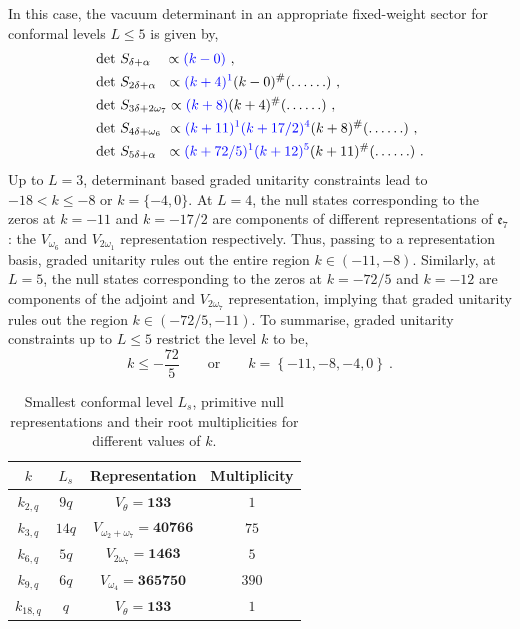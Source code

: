 In this case, the vacuum determinant in an appropriate fixed-weight sector for conformal levels $L \leqslant 5$ is given by, 
\begin{equation} \label{eq:lowlevele7det1to5}
\begin{split}
    &\text{det}~S_{\delta + \alpha} \ \ \ \propto \textcolor{blue}{(k - 0)}~, \\
    &\text{det}~S_{2\delta + \alpha} \ \ \propto \textcolor{blue}{(k + 4)^1}(k - 0)^{\#} (\ldots \ldots)~, \\ 
    &\text{det}~S_{3\delta + 2\omega_7} \propto \textcolor{blue}{(k + 8)} (k + 4 )^{\#} (\ldots \ldots)~, \\
    &\text{det}~S_{4\delta + \omega_6} \ \propto \textcolor{blue}{(k + 11)^{1}(k + 17/2)^4}(k+8)^{\#} (\ldots \ldots)~, \\
     &\text{det}~S_{5\delta + \alpha} \ \ \propto \textcolor{blue}{(k + 72/5)^{1}(k + 12)^5}(k+11)^{\#} (\ldots \ldots)~.
\end{split}
\end{equation}
Up to $L = 3$, determinant based graded unitarity constraints lead to $-18 < k \leqslant -8$ or $k = \{-4,0\}$. At $L = 4$, the null states corresponding to the zeros at $k = -11$ and $k = -17/2$ are components of different representations of $\mathfrak{e}_7$: the $V_{\omega_6}$ and $V_{2\omega_1}$ representation respectively. Thus, passing to a representation basis, graded unitarity rules out the entire region $k \in (-11,-8)$. Similarly, at $L = 5$, the null states corresponding to the zeros at $k = -72/5$ and $k = -12$ are components of the adjoint and $V_{2\omega_7}$ representation, implying that graded unitarity rules out the region $k \in (-72/5, -11)$. To summarise, graded unitarity constraints up to $L \leqslant 5$ restrict the level $k$ to be,
\begin{equation} \label{eq:e7lowlevelconst}
    k \leqslant -\frac{72}{5} \qquad \text{or} \qquad k = \left\{-11, -8, -4, 0 \right\}~.
\end{equation}

\begin{table}[]
    \centering
    \begin{tabular}{|c|c|c|c|}
        \hline\hline
        $k$ & $L_s$ & Representation & Multiplicity \\
        \hline\hline
        $k_{2,q}$  & $9q$ & $V_\theta =\textbf{133}$ & $1$ \\
        $k_{3,q}$  & $14q$  & $V_{\omega_2+\omega_7} = \textbf{40766}$ & $75$ \\
        $k_{6,q}$  & $5q$ & $V_{2\omega_7} = \textbf{1463}$ & $5$ \\
        $k_{9,q}$  & $6q$  & $V_{\omega_4} = \textbf{365750}$ & $390$ \\
        $k_{18,q}$ & $q$   & $V_\theta = \textbf{133}$ & $1$ \\
        \hline
    \end{tabular}
    \caption{\label{tb:e7zerodata} Smallest conformal level $L_s$, primitive null representations and their root multiplicities for different values of $k$.}
\end{table}

